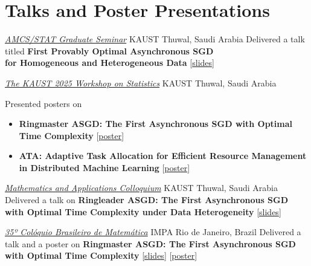 \documentclass[10pt,a4paper,sans]{moderncv}        %
\newcommand{\kaust}{KAUST}
\newcommand{\thuwal}{Thuwal, Saudi Arabia}
\begin{document}
\newpage

\section{Talks and Poster Presentations}

    {\textcolor{accent}{\href{https://cemse.kaust.edu.sa/events/by-type/graduate-seminar/2025/11/13/first-provably-optimal-asynchronous-sgd-homogeneous-and}{\textit{AMCS/STAT Graduate Seminar}}}}
    {\kaust}
    {\thuwal}
    {}
    {
    Delivered a talk titled \textbf{First Provably Optimal Asynchronous SGD \\ for Homogeneous and Heterogeneous Data}
    [{\href{https://artomaranjyan.github.io/assets/pdf/slides/Async_Graduate_Seminar.pdf}{slides}}]
    }

    {\textcolor{accent}{\href{https://cemse.kaust.edu.sa/events/by-type/workshop/2025/11/02/kaust-2025-workshop-statistics}{\textit{The KAUST 2025 Workshop on Statistics}}}}
    {\kaust}
    {\thuwal}
    {}
    {
      Presented posters on
      \begin{itemize}
        \item \textbf{Ringmaster ASGD: The First Asynchronous SGD with Optimal Time Complexity} [{\href{https://artomaranjyan.github.io/assets/pdf/posters/Ringmaster_ICML.pdf}{poster}}]
        \item \textbf{ATA: Adaptive Task Allocation for Efficient Resource Management \\ in Distributed Machine Learning} [{\href{https://artomaranjyan.github.io/assets/pdf/posters/ATA_ICML.pdf}{poster}}]
      \end{itemize}
    }

    {\textcolor{accent}{\href{https://cemse.kaust.edu.sa/events/by-type/mathematics-and-applications-colloquium/2025/10/28/ringleader-asgd-first}{\textit{Mathematics and Applications Colloquium}}}}
    {\kaust}
    {\thuwal}
    {}
    {
      Delivered a talk on \textbf{Ringleader ASGD: The First Asynchronous SGD \\ with Optimal Time Complexity under Data Heterogeneity} 
      [{\href{https://artomaranjyan.github.io/assets/pdf/slides/Ringleader_Colloquium.pdf}{slides}}]
    }

    {\textcolor{accent}{\href{https://impa.br/evento/35o-coloquio-brasileiro-de-matematica/}{\textit{35º Colóquio Brasileiro de Matemática}}}}
    {IMPA}
    {Rio de Janeiro, Brazil}
    {}{
      Delivered a talk and a poster on 
      \textbf{Ringmaster ASGD: The First Asynchronous SGD\\with Optimal Time Complexity}  
      [{\href{https://artomaranjyan.github.io/assets/pdf/slides/Ringmaster_IMPA.pdf}{slides}}]
      [{\href{https://artomaranjyan.github.io/assets/pdf/posters/Ringmaster_IMPA.pdf}{poster}}] 
    }
\end{document}
